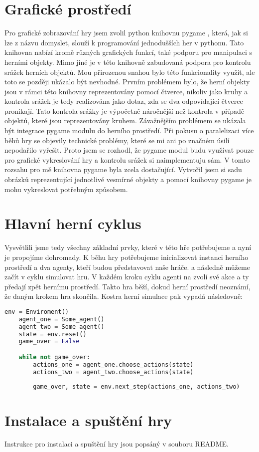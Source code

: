 \section{Grafické prostředí}
Pro grafické zobrazování hry jsem zvolil python knihovnu pygame \cite{pygame}, která, jak si lze z názvu domyslet, slouží k programování jednodušších her v pythonu.
Tato knihovna nabízí kromě různých grafických funkcí, také podporu pro manipulaci s herními objekty. Mimo jiné je v této knihovně zabudovaná podpora pro kontrolu srážek herních objektů.
Mou přirozenou snahou bylo této funkcionality využít, ale toto se později ukázalo být nevhodné.
Prvním problémem bylo, že herní objekty jsou v rámci této knihovny reprezentovány pomocí čtverce, nikoliv jako kruhy a kontrola srážek je tedy realizována jako dotaz, zda se dva odpovídající čtverce pronikají.
Tato kontrola srážky je výpočetně náročnější než kontrola v případě objektů, které jsou reprezentovány kruhem.  
Závažnějším problémem se ukázala být integrace pygame modulu do herního prostředí. Při pokusu o paralelizaci více běhů hry se objevily technické problémy, které se mi ani po značném úsilí nepodařilo vyřešit.
Proto jsem se rozhodl, že pygame modul budu využívat pouze pro grafické vykreslování hry a kontrolu srážek si naimplementuju sám.
V tomto rozsahu pro mě knihovna pygame byla zcela dostačující. Vytvořil jsem si sadu obrázků reprezentující jednotlivé vesmírné objekty a pomocí knihovny pygame je mohu vykreslovat potřebným způsobem.


\section{Hlavní herní cyklus}
Vysvětlili jsme tedy všechny základní prvky, které v této hře potřebujeme a nyní je propojíme dohromady.
K běhu hry potřebujeme inicializovat instanci herního prostředí a dva agenty, kteří budou představovat naše hráče.
a následně můžeme začít v cyklu simulovat hru.
V každém kroku cyklu agenti na zvolí své akce a ty předají zpět hernímu prostředí.
Takto hra běží, dokud herní prostředí neoznámí, že daným krokem hra skončila.
Kostra herní simulace pak vypadá následovně:

\begin{lstlisting}[language=Python]
    env = Enviroment()
    agent_one = Some_agent()
    agent_two = Some_agent()    
    state = env.reset()
    game_over = False

    while not game_over:
        actions_one = agent_one.choose_actions(state)    
        actions_two = agent_two.choose_actions(state)
        
        game_over, state = env.next_step(actions_one, actions_two)
\end{lstlisting}


\section{Instalace a spuštění hry}
Instrukce pro instalaci a spuštění hry jsou popsáný v souboru README.